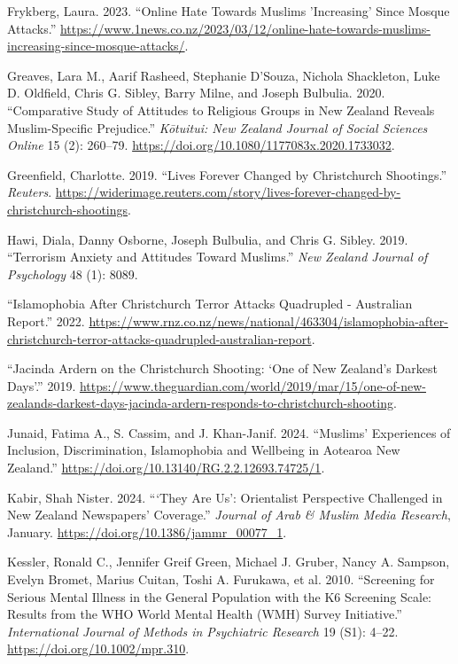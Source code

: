 \documentclass[
]{interact}
\newlength{\cslhangindent}
\newenvironment{CSLReferences}[2] %
 {\begin{list}{}{%
  \setlength{\itemindent}{0pt}
  \setlength{\leftmargin}{0pt}
  \setlength{\parsep}{0pt}
  \ifodd #1
   \setlength{\leftmargin}{\cslhangindent}
   \setlength{\itemindent}{-1\cslhangindent}
  \fi
  \setlength{\itemsep}{#2\baselineskip}}}
 {\end{list}}
\begin{document}
\begin{CSLReferences}{1}{0}
Frykberg, Laura. 2023. {``Online Hate Towards Muslims 'Increasing' Since
Mosque Attacks.''}
\url{https://www.1news.co.nz/2023/03/12/online-hate-towards-muslims-increasing-since-mosque-attacks/}.

Greaves, Lara M., Aarif Rasheed, Stephanie D'Souza, Nichola Shackleton,
Luke D. Oldfield, Chris G. Sibley, Barry Milne, and Joseph Bulbulia.
2020. {``Comparative Study of Attitudes to Religious Groups in New
Zealand Reveals Muslim-Specific Prejudice.''} \emph{K{ō}tuitui: New
Zealand Journal of Social Sciences Online} 15 (2): 260--79.
\url{https://doi.org/10.1080/1177083x.2020.1733032}.

Greenfield, Charlotte. 2019. {``Lives Forever Changed by Christchurch
Shootings.''} \emph{Reuters}.
\url{https://widerimage.reuters.com/story/lives-forever-changed-by-christchurch-shootings}.

Hawi, Diala, Danny Osborne, Joseph Bulbulia, and Chris G. Sibley. 2019.
{``Terrorism Anxiety and Attitudes Toward Muslims.''} \emph{New Zealand
Journal of Psychology} 48 (1): 8089.

{``Islamophobia After {C}hristchurch Terror Attacks Quadrupled -
{A}ustralian Report.''} 2022.
\url{https://www.rnz.co.nz/news/national/463304/islamophobia-after-christchurch-terror-attacks-quadrupled-australian-report}.

{``Jacinda {A}rdern on the {C}hristchurch Shooting: {`}One of {N}ew
{Z}ealand's Darkest Days'.''} 2019.
\url{https://www.theguardian.com/world/2019/mar/15/one-of-new-zealands-darkest-days-jacinda-ardern-responds-to-christchurch-shooting}.

Junaid, Fatima A., S. Cassim, and J. Khan-Janif. 2024. {``Muslims'
Experiences of Inclusion, Discrimination, {I}slamophobia and Wellbeing
in {A}otearoa {N}ew {Z}ealand.''}
\url{https://doi.org/10.13140/RG.2.2.12693.74725/1}.

Kabir, Shah Nister. 2024. {``{`}They Are Us{'}: Orientalist Perspective
Challenged in New Zealand Newspapers{'} Coverage.''} \emph{Journal of
Arab \& Muslim Media Research}, January.
\url{https://doi.org/10.1386/jammr_00077_1}.

Kessler, Ronald C., Jennifer Greif Green, Michael J. Gruber, Nancy A.
Sampson, Evelyn Bromet, Marius Cuitan, Toshi A. Furukawa, et al. 2010.
{``Screening for Serious Mental Illness in the General Population with
the K6 Screening Scale: Results from the WHO World Mental Health (WMH)
Survey Initiative.''} \emph{International Journal of Methods in
Psychiatric Research} 19 (S1): 4--22.
\url{https://doi.org/10.1002/mpr.310}.


\end{CSLReferences}
\end{document}
